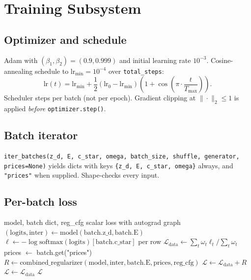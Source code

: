 \documentclass[11pt,a4paper]{article}
\begin{document}
\section{Training Subsystem}
\label{sec:train}

\subsection{Optimizer and schedule}

Adam with $(\beta_1, \beta_2) = (0.9, 0.999)$ and initial learning
rate $10^{-3}$. Cosine-annealing schedule to $\text{lr}_{\min} =
10^{-4}$ over \texttt{total\_steps}:
\begin{equation}
  \text{lr}(t) = \text{lr}_{\min} + \frac{1}{2}(\text{lr}_0 - \text{lr}_{\min})
                 \left(1 + \cos\!\left(\pi \cdot \frac{t}{T_{\max}}\right)\right).
\end{equation}
Scheduler steps per batch (not per epoch). Gradient clipping at
$\|\cdot\|_2 \le 1$ is applied \emph{before} \texttt{optimizer.step()}.

\subsection{Batch iterator}

\texttt{iter\_batches(z\_d, E, c\_star, omega, batch\_size, shuffle,
generator, prices=None)} yields dicts with keys
\texttt{\{z\_d, E, c\_star, omega\}} always, and
\texttt{"prices"} when supplied. Shape-checks every input.

\subsection{Per-batch loss}

\begin{algorithm}[H]
\caption{\texttt{\_compute\_batch\_loss}}
\begin{algorithmic}[1]
\Require model, batch dict, reg\_cfg
\Ensure scalar loss with autograd graph
\State $(\text{logits}, \text{inter}) \gets \text{model}(\text{batch.z\_d}, \text{batch.E})$
\State $\ell \gets -\log \mathrm{softmax}(\text{logits})[\text{batch.c\_star}]$ per row
\State $\mathcal{L}_{\text{data}} \gets \sum_t \omega_t \ell_t / \sum_t \omega_t$
  \State prices $\gets$ batch.get("prices")    
  \State $R \gets \mathrm{combined\_regularizer}(\text{model}, \text{inter}, \text{batch.E}, \text{prices}, \text{reg\_cfg})$
  \State $\mathcal{L} \gets \mathcal{L}_{\text{data}} + R$
\Else
  \State $\mathcal{L} \gets \mathcal{L}_{\text{data}}$
\EndIf
\State \Return $\mathcal{L}$
\end{algorithmic}
\end{algorithm}
\end{document}
